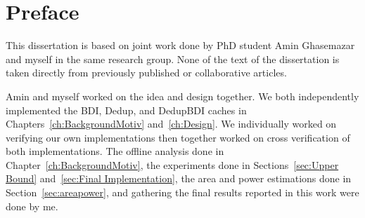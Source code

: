
\chapter{Preface}

This dissertation is based on joint work done by PhD student Amin Ghasemazar and myself in the same research group. None of the text of the dissertation is taken directly from previously published or collaborative articles.\par
Amin and myself worked on the idea and design together. We both independently implemented the BDI, Dedup, and DedupBDI caches in Chapters~\ref{ch:BackgroundMotiv} and~\ref{ch:Design}. We individually worked on verifying our own implementations then together worked on cross verification of both implementations.
The offline analysis done in Chapter~\ref{ch:BackgroundMotiv}, the experiments done in Sections~\ref{sec:Upper Bound} and~\ref{sec:Final Implementation}, the area and power estimations done in Section~\ref{sec:areapower}, and gathering the final results reported in this work were done by me.